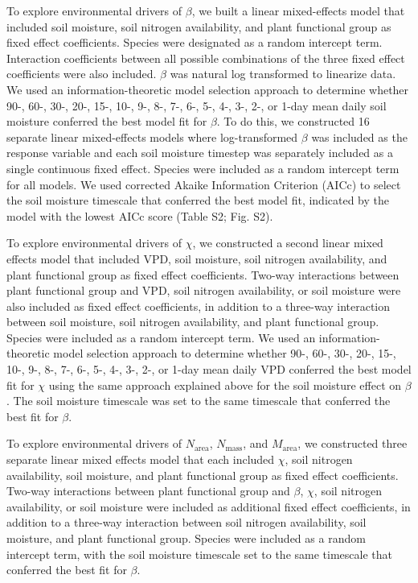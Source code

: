 To explore environmental drivers of $\beta$, we built a linear mixed-effects model that included soil moisture, soil nitrogen availability, and plant functional group as fixed effect coefficients. Species were designated as a random intercept term. Interaction coefficients between all possible combinations of the three fixed effect coefficients were also included. $\beta$ was natural log transformed to linearize data. We used an information-theoretic model selection approach to determine whether 90-, 60-, 30-, 20-, 15-, 10-, 9-, 8-, 7-, 6-, 5-, 4-, 3-, 2-, or 1-day mean daily soil moisture conferred the best model fit for $\beta$. To do this, we constructed 16 separate linear mixed-effects models where log-transformed $\beta$ was included as the response variable and each soil moisture timestep was separately included as a single continuous fixed effect. Species were included as a random intercept term for all models. We used corrected Akaike Information Criterion (AICc) to select the soil moisture timescale that conferred the best model fit, indicated by the model with the lowest AICc score (Table S2; Fig. S2).

To explore environmental drivers of $\chi$, we constructed a second linear mixed effects model that included VPD, soil moisture, soil nitrogen availability, and plant functional group as fixed effect coefficients. Two-way interactions between plant functional group and VPD, soil nitrogen availability, or soil moisture were also included as fixed effect coefficients, in addition to a three-way interaction between soil moisture, soil nitrogen availability, and plant functional group. Species were included as a random intercept term. We used an information-theoretic model selection approach to determine whether 90-, 60-, 30-, 20-, 15-, 10-, 9-, 8-, 7-, 6-, 5-, 4-, 3-, 2-, or 1-day mean daily VPD conferred the best model fit for $\chi$ using the same approach explained above for the soil moisture effect on $\beta$. The soil moisture timescale was set to the same timescale that conferred the best fit for $\beta$.

To explore environmental drivers of $N_\mathrm{area}$, $N_\mathrm{mass}$, and $M_\mathrm{area}$, we constructed three separate linear mixed effects model that each included $\chi$, soil nitrogen availability, soil moisture, and plant functional group as fixed effect coefficients. Two-way interactions between plant functional group and $\beta$, $\chi$, soil nitrogen availability, or soil moisture were included as additional fixed effect coefficients, in addition to a three-way interaction between soil nitrogen availability, soil moisture, and plant functional group. Species were included as a random intercept term, with the soil moisture timescale set to the same timescale that conferred the best fit for $\beta$.

